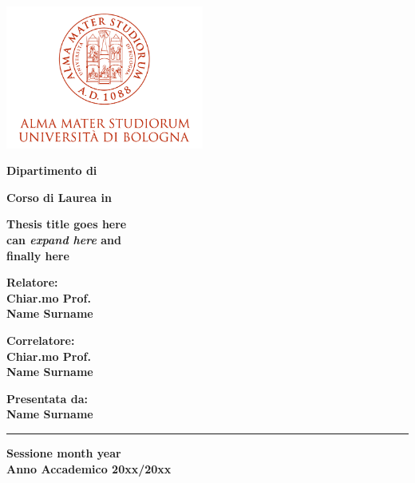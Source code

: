 \documentclass[12pt,a4paper,twoside]{book}
\begin{document}
\begin{titlepage}

\begin{center}

\includegraphics[width=6.5cm,height=4.7cm]{marchio-di-ateneo.png}

\vspace{10mm}

{\large{\bf{Dipartimento di }}} 

\vspace{5mm}

{\Large{\bf{Corso di Laurea in }}}

\vspace{15mm}

{\Huge{\bf Thesis title goes here }}\\
\vspace{3mm}
{\Huge{\bf can \textit{expand here} and}}\\
\vspace{3mm}
{\Huge{\bf finally here }}\\
\vspace{3mm}

\end{center}

\vspace{10mm}

\begin{minipage}[t]{0.40\textwidth}
{\Large{\bf Relatore: \\ Chiar.mo Prof.\\ Name Surname}}

\vspace{3mm}

{\Large{\bf Correlatore: \\ Chiar.mo Prof.\\ Name Surname}}
\end{minipage}
\hfill
\begin{minipage}[t]{0.40\textwidth}\raggedleft
{\Large{\bf Presentata da: \\ Name Surname}}
\end{minipage}

\vspace{30mm}

\rule[0.5cm]{15.8cm}{0.6mm}

\begin{center}
{\large{\bf Sessione month year \\}}
{\large{\bf Anno Accademico 20xx/20xx\\}}
\end{center}

\end{titlepage}
\end{document}

